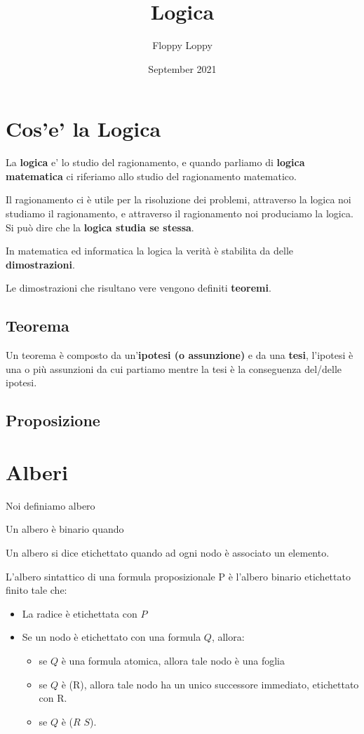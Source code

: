 \documentclass{article}
\begin{document}
\title{Logica}
\author{Floppy Loppy}
\date{September 2021}

\maketitle
\tableofcontents
\newpage


\section{Cos'e' la Logica}

La \textbf{logica} e' lo studio del ragionamento, e quando parliamo di \textbf{logica matematica} ci riferiamo allo studio del ragionamento matematico. \par
Il ragionamento ci è utile per la risoluzione dei problemi, attraverso la logica noi studiamo il ragionamento, e attraverso il ragionamento noi produciamo la logica. Si può dire che la \textbf{logica studia se stessa}.\par
In matematica ed informatica la logica la verità è stabilita da delle \textbf{dimostrazioni}. \par
Le dimostrazioni che risultano vere vengono definiti \textbf{teoremi}.

\subsection{Teorema}
Un teorema è composto da un'\textbf{ipotesi (o assunzione)} e da una \textbf{tesi}, l'ipotesi è  una o più assunzioni da cui partiamo mentre la tesi è la conseguenza del/delle ipotesi.


\subsection{Proposizione}

\section{Alberi}
Noi definiamo albero \par
Un albero è binario quando \par 
Un albero si dice etichettato quando ad ogni nodo è associato un elemento. \par

L'albero sintattico di una formula proposizionale P è l'albero binario etichettato finito tale che:

\begin{itemize}
        \item La radice è etichettata con $P$
        \item Se un nodo è etichettato con una formula  $Q$, allora:
                \begin{itemize}
                        \item se $Q$ è una formula atomica, allora tale nodo è una foglia
                        \item se $Q$ è (R), allora tale nodo ha un unico successore immediato, etichettato con R.
                        \item se $Q$ è ($R$ $S$).
                \end{itemize}
\end{itemize}
\end{document}
